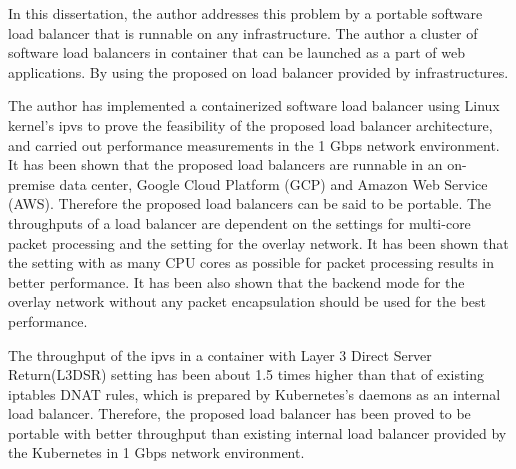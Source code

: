 In this dissertation, the author addresses this problem by  a portable software load balancer that is runnable on any infrastructure.
The author  a cluster of software load balancers in container that can be launched as a part of web applications.
%
By using the proposed on load balancer provided by infrastructures.

The author has implemented a containerized software load balancer using Linux kernel's ipvs to prove the feasibility of the proposed load balancer architecture, and carried out performance measurements in the 1 Gbps network environment.
It has been shown that the proposed load balancers are runnable in an on-premise data center, Google Cloud Platform (GCP) and Amazon Web Service (AWS).
Therefore the proposed load balancers can be said to be portable.
%
The throughputs of a load balancer are dependent on the settings for multi-core packet processing and the setting for the overlay network.
It has been shown that the setting with as many CPU cores as possible for packet processing results in better performance.
It has been also shown that the backend mode for the overlay network without any packet encapsulation should be used for the best performance.


The throughput of the ipvs in a container with Layer 3 Direct Server Return(L3DSR) setting has been about 1.5 times higher than that of existing iptables DNAT rules, which is prepared by Kubernetes's daemons as an internal load balancer.
Therefore, the proposed load balancer has been proved to be portable with better throughput than existing internal load balancer provided by the Kubernetes in 1 Gbps network environment.

